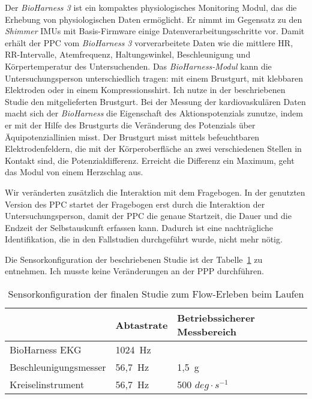 Der \emph{BioHarness 3} ist ein kompaktes physiologisches Monitoring Modul, das die Erhebung von physiologischen Daten ermöglicht. Er nimmt im Gegensatz zu den \emph{Shimmer} \acp{IMU} mit Basis-Firmware einige Datenverarbeitungsschritte vor. Damit erhält der \ac{PPC} vom \emph{BioHarness 3} vorverarbeitete Daten wie die mittlere \ac{HR}, RR-Intervalle, Atemfrequenz, Haltungswinkel, Beschleunigung und Körpertemperatur des Untersuchenden. Das \emph{BioHarness-Modul} kann die Untersuchungsperson unterschiedlich tragen: mit einem Brustgurt, mit klebbaren Elektroden oder in einem Kompressionsshirt. Ich nutze in der beschriebenen Studie den mitgelieferten Brustgurt. Bei der Messung der kardiovaskulären Daten macht sich der \emph{BioHarness} die Eigenschaft des Aktionspotenzials zunutze, indem er mit der Hilfe des Brustgurts die Veränderung des Potenzials über Äquipotenziallinien misst. Der Brustgurt misst mittels befeuchtbaren Elektrodenfeldern, die mit der Körperoberfläche an zwei verschiedenen Stellen in Kontakt sind, die Potenzialdifferenz. Erreicht die Differenz ein Maximum, geht das Modul von einem Herzschlag aus. 

Wir veränderten zusätzlich die Interaktion mit dem Fragebogen. In der genutzten Version des \ac{PPC} startet der Fragebogen erst durch die Interaktion der Untersuchungsperson, damit der \ac{PPC} die genaue Startzeit, die Dauer und die Endzeit der Selbstauskunft erfassen kann. Dadurch ist eine nachträgliche Identifikation, die in den Fallstudien durchgeführt wurde, nicht mehr nötig. 

Die Sensorkonfiguration der beschriebenen Studie ist der Tabelle~\ref{tab:sensorkonfiguration_studie_laufen} zu entnehmen. Ich musste keine Veränderungen an der \ac{PPP} durchführen. 

\begin{table}[!htb]
	\caption[Sensorkonfiguration der finalen Studie zum Flow-Erleben beim Laufen]{Sensorkonfiguration der finalen Studie zum Flow-Erleben beim Laufen}
	\label{tab:sensorkonfiguration_studie_laufen}
	\begin{tabularx}{\textwidth}{p{} p{} p{}}
\toprule
& Abtastrate & Betriebssicherer Messbereich \\
\midrule
BioHarness EKG & 1024~Hz & \\
Beschleunigungsmesser & 56,7~Hz & 1,5~g \\
Kreiselinstrument & 56,7~Hz & 500 $deg \cdot s^{-1}$ \\
\bottomrule
\end{tabularx}
\end{table}

